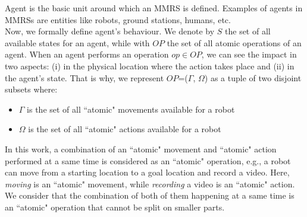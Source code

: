 \documentclass[journal]{IEEEtran}
\theoremstyle{definition}
\newcommand\patrizio[1]{\nb{Patrizio}{#1}}
\newcommand\ivano[1]{\nb{Ivano}{#1}}
\begin{document}


Agent is the basic unit around which an MMRS  is defined. Examples of agents in MMRSs are entities like robots, ground stations, humans, etc.\\













Now, we formally define agent's behaviour. We denote by  $S$ the set of all available states for an agent, while with $OP$ the set of all atomic operations of an agent. When an agent performs an operation $op \in OP$, we can see the  impact in two aspects: (i) in the physical location where the action takes place and (ii) in  the agent's state.
That is why, we represent  $OP$=($\Gamma$, $\Omega$) as a tuple of two disjoint subsets where:
\begin{itemize}
    \item $\Gamma$ is the set of all ``atomic" movements available for a robot
    \item $\Omega$ is the set of all ``atomic" actions available for a robot
\end{itemize}

In this work, a combination of an ``atomic" movement and ``atomic" action  performed at a same time is considered as an ``atomic" operation, e.g., a robot can move from a starting location to a goal location and record a video. Here, \textit{moving} is an ``atomic" movement, while \textit{recording} a video is an ``atomic" action. We consider that the combination of both of them happening at a same time is an ``atomic" operation that cannot be split on smaller parts. 
\end{document}
